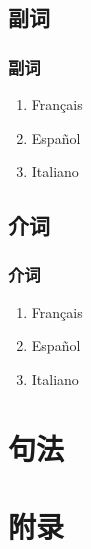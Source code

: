 \documentclass[UTF8,a4paper,titlepage,10pt]{report}
\begin{document}
\chapter{副词}
\label{sec:org6217b22}

\section{副词}
\label{sec:orge453c6c}

\begin{enumerate}
\item Français
\label{sec:orge6cef86}

\item Español
\label{sec:org3c26905}

\item Italiano
\label{sec:org4b5f84b}
\end{enumerate}

\chapter{介词}
\label{sec:org238f44c}

\section{介词}
\label{sec:orgf2651c1}

\begin{enumerate}
\item Français
\label{sec:org8aaf9b8}

\item Español
\label{sec:org0c36761}

\item Italiano
\label{sec:org5f27705}
\end{enumerate}

\part{句法}
\label{sec:org0e5c9f7}

\newpage
\part{附录}
\label{sec:orgb1e3829}

\listoftables

\listoffigures

\printindex
\end{document}
